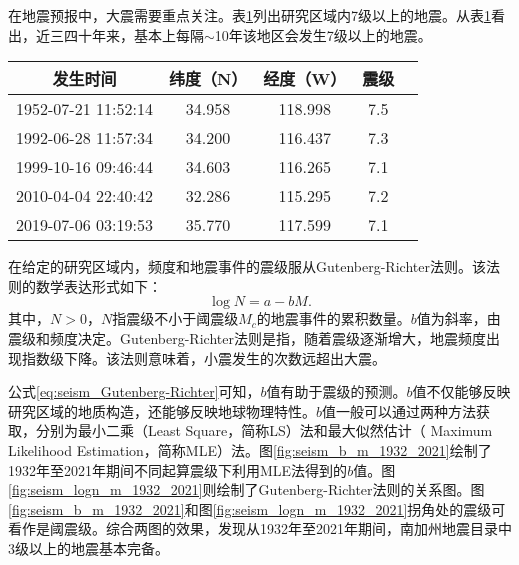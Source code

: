在地震预报中，大震需要重点关注。表\ref{tab:seism_magnitude_7}列出研究区域内7级以上的地震。从表\ref{tab:seism_magnitude_7}看出，近三四十年来，基本上每隔$\sim$10年该地区会发生7级以上的地震。

\begin{table}[!htbp]
  \label{tab:seism_magnitude_7}
  \centering
  \footnotesize
  \begin{tabular}{ccccc} 
    \toprule
    发生时间 & 纬度（N） & 经度（W） & 震级 \\
    \midrule
    1952-07-21 11:52:14 & 34.958 & 118.998 & 7.5 \\
    1992-06-28 11:57:34 & 34.200 & 116.437 & 7.3 \\
    1999-10-16 09:46:44 & 34.603 & 116.265 & 7.1 \\
    2010-04-04 22:40:42 & 32.286 & 115.295 & 7.2 \\
    2019-07-06 03:19:53 & 35.770 & 117.599 & 7.1 \\
    \bottomrule
  \end{tabular}
\end{table}

在给定的研究区域内，频度和地震事件的震级服从Gutenberg-Richter法则\citep{Gutenberg1994Frequency,Panakkat2007Neural}。该法则的数学表达形式如下：
\begin{equation}
  \label{eq:seism_Gutenberg-Richter}
  \log N=a-bM.
\end{equation}
其中，$N>0$，$N$指震级不小于阈震级$M_c$的地震事件的累积数量。$b$值为斜率，由震级和频度决定。Gutenberg-Richter法则是指，随着震级逐渐增大，地震频度出现指数级下降\citep{Asim2018Earthquake}。该法则意味着，小震发生的次数远超出大震。

公式\ref{eq:seism_Gutenberg-Richter}可知，$b$值有助于震级的预测。$b$值不仅能够反映研究区域的地质构造，还能够反映地球物理特性。$b$值一般可以通过两种方法获取，分别为最小二乘（Least Square，简称LS）法和最大似然估计（ Maximum Likelihood Estimation，简称MLE）法。图\ref{fig:seism_b_m_1932_2021}绘制了1932年至2021年期间不同起算震级下利用MLE法得到的$b$值。图\ref{fig:seism_logn_m_1932_2021}则绘制了Gutenberg-Richter法则的关系图。图\ref{fig:seism_b_m_1932_2021}和图\ref{fig:seism_logn_m_1932_2021}拐角处的震级可看作是阈震级。综合两图的效果，发现从1932年至2021年期间，南加州地震目录中3级以上的地震基本完备。

